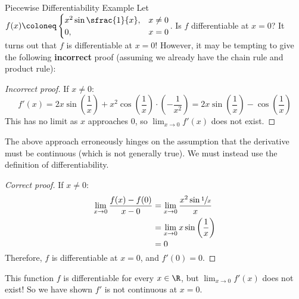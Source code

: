 \begin{exbox}{Piecewise Differentiability Example}{}
    Let $f(x) \coloneq \begin{cases}
        x^2 \sin \sfrac{1}{x}, & x \neq 0 \\
        0, & x = 0
    \end{cases}$. Is $f$ differentiable at $x = 0$?
    \tcblower
    It turns out that $f$ is differentiable at $x = 0$! However, it may be tempting to give the following \textbf{incorrect} proof (assuming we already have the chain rule and product rule):
    \begin{proof}[Incorrect proof]
        If $x \neq 0$:
        \[ f\prime(x) = 2x \sin \left( \frac{1}{x} \right) + x^2 \cos \left( \frac{1}{x} \right) \cdot \left( -\frac{1}{x^2} \right) = 2x\sin \left( \frac{1}{x} \right) - \cos \left( \frac{1}{x} \right) \]
        This has no limit as $x$ approaches $0$, so $\lim_{x \to 0} f\prime(x)$ does not exist.
    \end{proof}
    The above approach erroneously hinges on the assumption that the derivative must be continuous (which is not generally true). We must instead use the definition of differentiability.
    \begin{proof}[Correct proof]
        If $x \neq 0$:
        \begin{align*}
             \lim_{x \to 0} \frac{f(x) - f(0)}{x - 0}
             &= \lim_{x \to 0} \frac{x^2 \sin \sfrac{1}{x}}{x} \\
             &= \lim_{x \to 0} x \sin \left( \frac{1}{x} \right) \\
             &= 0
        \end{align*}
        Therefore, $f$ is differentiable at $x = 0$, and $f\prime(0) = 0$.
    \end{proof}
    This function $f$ is differentiable for every $x \in \R$, but $\lim_{x \to 0} f\prime(x)$ does not exist! So we have shown $f\prime$ is not continuous at $x = 0$.
\end{exbox}

